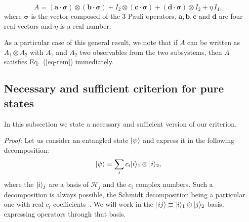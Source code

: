 \[ A = (\mathbf{a}\cdot\boldsymbol{\sigma})  \otimes  (\mathbf{b}\cdot\boldsymbol{\sigma})  + I_2 \otimes (\mathbf{c}\cdot\boldsymbol{\sigma}) + (\mathbf{d}\cdot\boldsymbol{\sigma} ) \otimes I_2 +\eta \, I_4 ,\]
where $\boldsymbol{\sigma}$ is the vector composed of the 3 Pauli operators,  $\mathbf{a}, \mathbf{b}, \mathbf{c}$ and $\mathbf{d}$ are
four real vectors and $\eta$ is a real number.

 As a particular case of this general result, we note that if $A$ can be written as $A_1 \otimes A_2$ with $A_1$ and $A_2$ two observables from the two subsystems, then $A$ satisfies Eq.~(\ref{eq-rem}) immediately.
 
 \subsection{Necessary and sufficient criterion for pure states}

In this subsection we state a necessary and sufficient version of our criterion.


\emph{Proof:} Let us consider an entangled state $| \psi \rangle$ and express it in the following decomposition:
\[ | \psi \rangle=\sum_i c_i | i \rangle_1\otimes | i \rangle_2,\]
where the $| i \rangle_j$ are a basis of $\mathcal{H}_j$ and the $c_i$ complex numbers. Such a decomposition is always possible, the Schmidt decomposition being a particular one with real $c_i$ coefficients~\cite{Min05}.
We will work in the $| ij \rangle \equiv | i \rangle_1\otimes | j \rangle_2$ basis, expressing operators through that basis.

